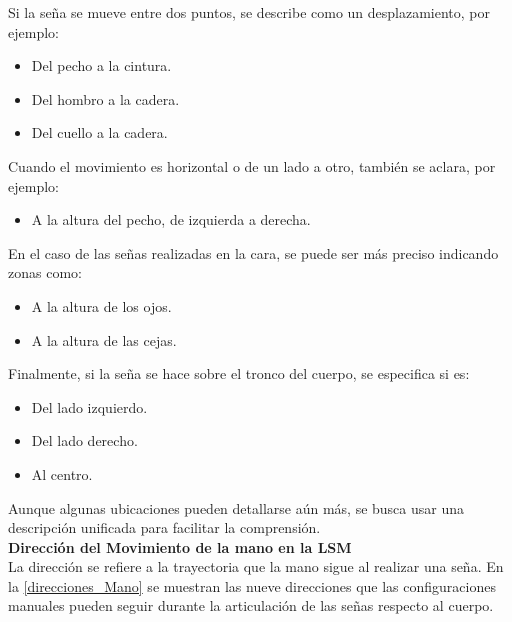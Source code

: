 Si la seña se mueve entre dos puntos, se describe como un desplazamiento, por ejemplo:

\begin{itemize}
    \item Del pecho a la cintura.
    \item Del hombro a la cadera.
    \item Del cuello a la cadera.
\end{itemize}

Cuando el movimiento es horizontal o de un lado a otro, también se aclara, por ejemplo:
\begin{itemize}
    \item A la altura del pecho, de izquierda a derecha.
\end{itemize}

En el caso de las señas realizadas en la cara, se puede ser más preciso indicando zonas como:
\begin{itemize}
    \item A la altura de los ojos.
    \item A la altura de las cejas.    
\end{itemize}

Finalmente, si la seña se hace sobre el tronco del cuerpo, se especifica si es:
\begin{itemize}
    \item Del lado izquierdo.
    \item Del lado derecho.
    \item Al centro.
\end{itemize}

Aunque algunas ubicaciones pueden detallarse aún más, se busca usar una descripción unificada para facilitar la comprensión.\\

\textbf{Dirección del Movimiento de la mano en la LSM}\\
La dirección se refiere a la trayectoria que la mano sigue al realizar una seña. En la \autoref{direcciones_Mano} se muestran las nueve direcciones que las configuraciones manuales pueden seguir durante la articulación de las señas respecto al cuerpo.

